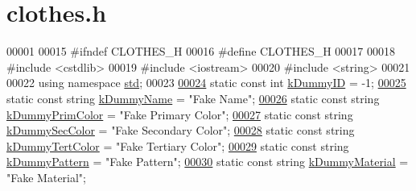 \hypertarget{clothes_8h_source}{}\section{clothes.\+h}

\begin{DoxyCode}
00001 
00015 \textcolor{preprocessor}{#ifndef CLOTHES\_H}
00016 \textcolor{preprocessor}{#define CLOTHES\_H}
00017 
00018 \textcolor{preprocessor}{#include <cstdlib>}
00019 \textcolor{preprocessor}{#include <iostream>}
00020 \textcolor{preprocessor}{#include <string>}
00021 
00022 \textcolor{keyword}{using namespace }\mbox{\hyperlink{namespacestd}{std}};
00023 
\mbox{\hyperlink{clothes_8h_a77186917343a417a2369cdff0bc86d31}{00024}} \textcolor{keyword}{static} \textcolor{keyword}{const} \textcolor{keywordtype}{int} \mbox{\hyperlink{clothes_8h_a77186917343a417a2369cdff0bc86d31}{kDummyID}} = -1;
\mbox{\hyperlink{clothes_8h_adba739b5125fd5a4066ec0ef063c0657}{00025}} \textcolor{keyword}{static} \textcolor{keyword}{const} \textcolor{keywordtype}{string} \mbox{\hyperlink{clothes_8h_adba739b5125fd5a4066ec0ef063c0657}{kDummyName}} = \textcolor{stringliteral}{"Fake Name"};
\mbox{\hyperlink{clothes_8h_a1b9c685d3bf2811d95b65e0d396c1344}{00026}} \textcolor{keyword}{static} \textcolor{keyword}{const} \textcolor{keywordtype}{string} \mbox{\hyperlink{clothes_8h_a1b9c685d3bf2811d95b65e0d396c1344}{kDummyPrimColor}} = \textcolor{stringliteral}{"Fake Primary Color"};
\mbox{\hyperlink{clothes_8h_a71c39811135425d881af7760da63a73a}{00027}} \textcolor{keyword}{static} \textcolor{keyword}{const} \textcolor{keywordtype}{string} \mbox{\hyperlink{clothes_8h_a71c39811135425d881af7760da63a73a}{kDummySecColor}} = \textcolor{stringliteral}{"Fake Secondary Color"};
\mbox{\hyperlink{clothes_8h_a094dde85547895fd70dafb3ab10c6783}{00028}} \textcolor{keyword}{static} \textcolor{keyword}{const} \textcolor{keywordtype}{string} \mbox{\hyperlink{clothes_8h_a094dde85547895fd70dafb3ab10c6783}{kDummyTertColor}} = \textcolor{stringliteral}{"Fake Tertiary Color"};
\mbox{\hyperlink{clothes_8h_a2e72ae4d77adb7bc9cbecf4dea1e9e22}{00029}} \textcolor{keyword}{static} \textcolor{keyword}{const} \textcolor{keywordtype}{string} \mbox{\hyperlink{clothes_8h_a2e72ae4d77adb7bc9cbecf4dea1e9e22}{kDummyPattern}} = \textcolor{stringliteral}{"Fake Pattern"};
\mbox{\hyperlink{clothes_8h_a9df1268c6668ae4e2a728ccf032cc33d}{00030}} \textcolor{keyword}{static} \textcolor{keyword}{const} \textcolor{keywordtype}{string} \mbox{\hyperlink{clothes_8h_a9df1268c6668ae4e2a728ccf032cc33d}{kDummyMaterial}} = \textcolor{stringliteral}{"Fake Material"};

\end{DoxyCode}
